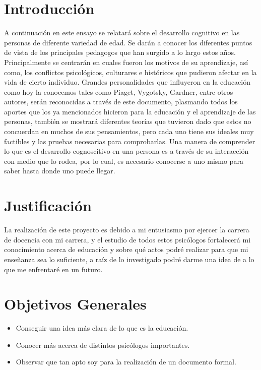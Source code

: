 \documentclass{bmcart}
\begin{document}
\newpage
\section{Introducción}
A continuación en este ensayo se relatará sobre el desarrollo cognitivo en las personas de diferente variedad de edad. Se darán a conocer los diferentes puntos de vista de los principales pedagogos que han surgido a lo largo estos años.
\newline 
Principalmente se centrarán en cuales fueron los motivos de su aprendizaje, así como, los conflictos psicológicos, culturares e históricos que pudieron afectar en la vida de cierto individuo.
\newline 
Grandes personalidades que influyeron en la educación como hoy la conocemos tales como Piaget, Vygotsky, Gardner, entre otros autores, serán reconocidas a través de este documento, plasmando todos los aportes que los ya mencionados hicieron para la educación y el aprendizaje de las personas, también se mostrará diferentes teorías que tuvieron dado que estos no concuerdan en muchos de sus pensamientos, pero cada uno tiene sus ideales muy factibles y las pruebas necesarias para comprobarlas.
\newline 
Una manera de comprender lo que es el desarrollo cognoscitivo en una persona es a través de su interacción con medio que lo rodea, por lo cual, es necesario conocerse a uno mismo para saber hasta donde uno puede llegar.

\section{Justificación }
La realización de este proyecto es debido a mi entusiasmo por ejercer la carrera de docencia con mi carrera, y el estudio de todos estos psicólogos fortalecerá mi conocimiento acerca de educación y sobre qué actos podré realizar para que mi enseñanza sea lo suficiente, a raíz de lo investigado podré darme una idea de a lo que me enfrentaré en un futuro.

\section{Objetivos Generales}
	\begin{itemize}
\item Conseguir una idea más clara de lo que es la educación.
\newline 
\item Conocer más acerca de distintos psicólogos importantes.
\newline 
\item Observar que tan apto soy para la realización de un documento formal.
	\end{itemize}
		
\end{document}
